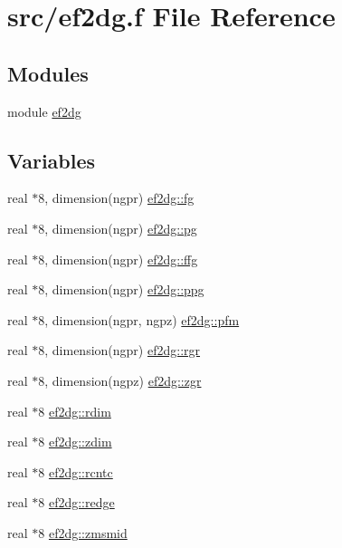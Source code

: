\hypertarget{ef2dg_8f}{
\section{src/ef2dg.f File Reference}
\label{ef2dg_8f}
}
\subsection*{Modules}
\begin{CompactItemize}
\item 
module \hyperlink{namespaceef2dg}{ef2dg}
\end{CompactItemize}
\subsection*{Variables}
\begin{CompactItemize}
\item 
real $\ast$8, dimension(ngpr) \hyperlink{namespaceef2dg_c2f458f8ca8817889844012157d9c449}{ef2dg::fg}
\item 
real $\ast$8, dimension(ngpr) \hyperlink{namespaceef2dg_507db5a901c6ff6e8b80ace4211efd3d}{ef2dg::pg}
\item 
real $\ast$8, dimension(ngpr) \hyperlink{namespaceef2dg_9fdb7b146d76ce136d172e5be1672df2}{ef2dg::ffg}
\item 
real $\ast$8, dimension(ngpr) \hyperlink{namespaceef2dg_b55b4db9b403180fe2861c7cd43c98c8}{ef2dg::ppg}
\item 
real $\ast$8, dimension(ngpr, ngpz) \hyperlink{namespaceef2dg_04b90c623a3316539f8336b49bc8c3b7}{ef2dg::pfm}
\item 
real $\ast$8, dimension(ngpr) \hyperlink{namespaceef2dg_45656eca6a7e6c845eddb72e77912e0a}{ef2dg::rgr}
\item 
real $\ast$8, dimension(ngpz) \hyperlink{namespaceef2dg_e89bb2455ad1b4ab57df511af6651cea}{ef2dg::zgr}
\item 
real $\ast$8 \hyperlink{namespaceef2dg_cd4de75f2280fe818a45a15f136abde5}{ef2dg::rdim}
\item 
real $\ast$8 \hyperlink{namespaceef2dg_b82c3339f920d26c7fabe95ce9f384ae}{ef2dg::zdim}
\item 
real $\ast$8 \hyperlink{namespaceef2dg_5bd161d0c4b9da7f1d03adaa1d39ad06}{ef2dg::rcntc}
\item 
real $\ast$8 \hyperlink{namespaceef2dg_40641084d368b57d08ee7f6ac8ffcd4a}{ef2dg::redge}
\item 
real $\ast$8 \hyperlink{namespaceef2dg_4061e999562aae54b6b48dfafd56c64d}{ef2dg::zmsmid}

\end{CompactItemize}
